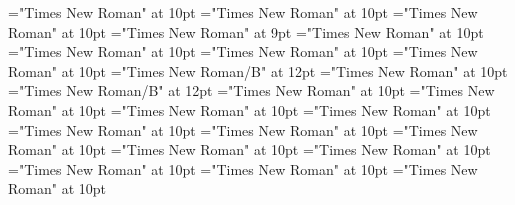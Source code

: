 \documentclass[gps1,twoside]{article}
\begin{document}
\font\spanspancomplexformentryrefsminorentryvariantbefore="Times New Roman" at 10pt
\font\complexformentryrefsminorentryvariantbefore="Times New Roman" at 10pt
\font\complexformentryrefsminorentryvariantafter="Times New Roman" at 10pt
\font\complexformtypecomplexformtypecomplexformtypescomplexformentryrefcomplexformentryrefsminorentryvariantbefore="Times New Roman" at 9pt
\font\complexformtypescomplexformentryrefcomplexformentryrefsminorentryvariantafter="Times New Roman" at 10pt
\font\spanspanabbreviationcomplexformtypecomplexformtypescomplexformentryrefcomplexformentryrefsminorentryvariantbefore="Times New Roman" at 10pt
\font\spanabbreviationcomplexformtypecomplexformtypescomplexformentryrefcomplexformentryrefsminorentryvariantlastchildafter="Times New Roman" at 10pt
\font{}="Times New Roman" at 10pt
\font\spanbzhheadwordreferencedentryreferencedentriescomplexformentryrefcomplexformentryrefsminorentryvariant="Times New Roman/B" at 12pt
\font\spanspanheadwordreferencedentryreferencedentriescomplexformentryrefcomplexformentryrefsminorentryvariantbefore="Times New Roman" at 10pt
\font\spanheadwordreferencedentryreferencedentriescomplexformentryrefcomplexformentryrefsminorentryvariant="Times New Roman/B" at 12pt
\font\spanspandefinitionorglossreferencedentryreferencedentriescomplexformentryrefcomplexformentryrefsminorentryvariantbefore="Times New Roman" at 10pt
\font\spandefinitionorglossreferencedentryreferencedentriescomplexformentryrefcomplexformentryrefsminorentryvariantfirstchildbefore="Times New Roman" at 10pt
\font\spanspansummarycomplexformentryrefcomplexformentryrefsminorentryvariantbefore="Times New Roman" at 10pt
\font\spansummarycomplexformentryrefcomplexformentryrefsminorentryvariantfirstchildbefore="Times New Roman" at 10pt
\font\nontrivialentryrootnontrivialentryrootnontrivialentryrootscomplexformentryrefcomplexformentryrefsminorentryvariantbefore="Times New Roman" at 10pt
\font\nontrivialentryrootscomplexformentryrefcomplexformentryrefsminorentryvariantbefore="Times New Roman" at 10pt
\font\spanspansummarydefinitionminorentryvariantbefore="Times New Roman" at 10pt
\font\spansummarydefinitionminorentryvariantfirstchildbefore="Times New Roman" at 10pt
\font\spansummarydefinitionminorentryvariantlastchildafter="Times New Roman" at 10pt
\font\spanspanvisiblecomplexformbackrefsminorentryvariantbefore="Times New Roman" at 10pt
\font\visiblecomplexformbackrefsminorentryvariantbefore="Times New Roman" at 10pt
\font\visiblecomplexformbackrefsminorentryvariantafter="Times New Roman" at 10pt
\end{document}
